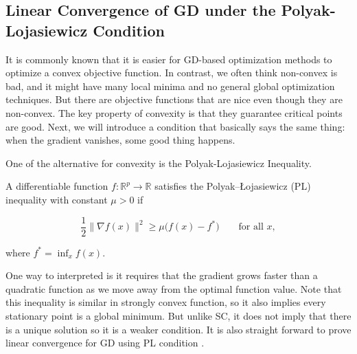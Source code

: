 \documentclass[twoside]{article}
\begin{document}


\subsection{Linear Convergence of GD under the Polyak-Lojasiewicz Condition}

It is commonly known that it is easier for GD-based optimization methods to optimize a convex objective function.
In contrast, we often think non-convex is bad, and it might have many local minima and no general global optimization techniques.
But there are objective functions that are nice even though they are non-convex.
The key property of convexity is that they guarantee critical points are good.  
Next, we will introduce a condition that basically says the same thing: when the gradient vanishes, some good thing happens.

One of the alternative for convexity is the Polyak-Lojasiewicz Inequality.
\begin{definition}[PL inequality]
A differentiable function $f: \mathbb{R}^p \to \mathbb{R}$ satisfies the Polyak–Łojasiewicz
(PL) inequality with constant $\mu > 0$ if

$$\frac{1}{2}\|\nabla f(x)\|^2 \geq \mu\bigl(f(x) - f^*\bigr) \qquad \text{for all } x,$$

where $f^* = \inf_x f(x)$.
\end{definition}


One way to interpreted is it requires that the gradient grows faster than a quadratic function as we move away from the optimal function value. 
Note that this inequality is similar in strongly convex function, so it also implies every stationary point is a global minimum. 
But unlike SC, it does not imply that there is a unique solution so it is a weaker condition. 
It is also straight forward to prove linear convergence for GD using PL condition \citep{Hamed2016}.
\end{document}
